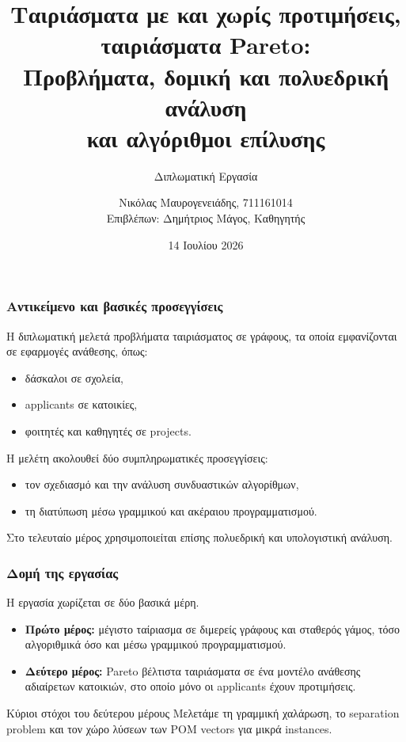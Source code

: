 \documentclass{beamer}
\title[Nikolas-Mavrogeneiadis - Thesis]{
	Ταιριάσματα με και χωρίς προτιμήσεις,\\
	ταιριάσματα Pareto:\\
	Προβλήματα, δομική και πολυεδρική ανάλυση\\
	και αλγόριθμοι επίλυσης
}
\subtitle{Διπλωματική Εργασία}
\author[Ν. Μαυρογενειάδης]
{Νικόλας Μαυρογενειάδης, 711161014 \\ Επιβλέπων: Δημήτριος Μάγος, Καθηγητής}
\institute[ΠΑΔΑ]
{
	Τμήμα Μηχανικών Πληροφορικής και Υπολογιστών\\
	Πανεπιστήμιο Δυτικής Αττικής
}
\date[14 Ιουλίου 2026]
{14 Ιουλίου 2026}
\newcommand{\gr}{\selectlanguage{greek}}
\begin{document}
	\gr
	\frame{\titlepage}
	
	
	\begin{frame}
		\frametitle{Αντικείμενο και βασικές προσεγγίσεις}
		
		Η διπλωματική μελετά προβλήματα ταιριάσματος σε γράφους, τα οποία εμφανίζονται σε εφαρμογές ανάθεσης, όπως:
		
		\begin{itemize}
			\item δάσκαλοι σε σχολεία,
			\item applicants σε κατοικίες,
			\item φοιτητές και καθηγητές σε projects.
		\end{itemize}
		
		\vspace{0.2cm}
		
		Η μελέτη ακολουθεί δύο συμπληρωματικές προσεγγίσεις:
		
		\begin{itemize}
			\item τον σχεδιασμό και την ανάλυση συνδυαστικών αλγορίθμων,
			\item τη διατύπωση μέσω γραμμικού και ακέραιου προγραμματισμού.
		\end{itemize}
		
		Στο τελευταίο μέρος χρησιμοποιείται επίσης πολυεδρική και υπολογιστική ανάλυση.
	\end{frame}
	
	\begin{frame}
		\frametitle{Δομή της εργασίας}
		
		Η εργασία χωρίζεται σε δύο βασικά μέρη.
		
		\vspace{0.2cm}
		
		\begin{itemize}
			\item \textbf{Πρώτο μέρος:}
			μέγιστο ταίριασμα σε διμερείς γράφους και σταθερός γάμος, τόσο αλγοριθμικά όσο και μέσω γραμμικού προγραμματισμού.
			
			\vspace{0.2cm}
			
			\item \textbf{Δεύτερο μέρος:}
			Pareto βέλτιστα ταιριάσματα σε ένα μοντέλο ανάθεσης αδιαίρετων κατοικιών, στο οποίο μόνο οι applicants έχουν προτιμήσεις.
		\end{itemize}
		
		\begin{block}{Κύριοι στόχοι του δεύτερου μέρους}
			Μελετάμε τη γραμμική χαλάρωση, το separation problem και τον χώρο λύσεων των POM vectors για μικρά instances.
		\end{block}
	\end{frame}
	
\end{document}
